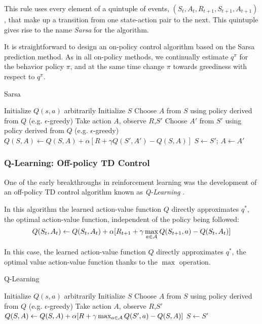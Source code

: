 This rule uses every element of a quintuple of events, $(S_t, A_t, R_{t+1}, S_{t+1}, A_{t+1})$, that make up a transition from one state-action pair to the next.
This quintuple gives rise to the name \textit{Sarsa} for the algorithm.

It is straightforward to design an on-policy control algorithm based on the Sarsa prediction method. As in all on-policy methods, we continually estimate $q^\pi$
for the behavior policy $\pi$, and at the same time change $\pi$ towards greediness with respect to $q^\pi$.

\begin{algorithm}[H]
    \caption{Sarsa}
    \label{alg:sarsa}
    \begin{algorithmic}[1]
        \STATE Initialize $Q(s,a)$ arbitrarily
        \LOOP
            \STATE Initialize $S$
            \STATE Choose $A$ from $S$ using policy derived from $Q$ (e.g. $\epsilon$-greedy)
            \REPEAT
                \STATE Take action $A$, observe $R$,$S'$
                \STATE Choose $A'$ from $S'$ using policy derived from $Q$ (e.g. $\epsilon$-greedy)
                \STATE $Q(S,A) \gets Q(S,A) + \alpha[R + \gamma Q(S',A') - Q(S, A)]$
                \STATE $S \gets S'$; $A \gets A'$
        \ENDLOOP
    \end{algorithmic}
\end{algorithm}

\subsubsection{Q-Learning: Off-policy TD Control}
One of the early breakthroughs in reinforcement learning was the development of an off-policy TD control algorithm known as \textit{Q-Learning}
\cite{Watkins:1989}.

In this algorithm the learned action-value function $Q$ directly approximates $q^*$, the optimal action-value function, independent of the 
policy being followed:
\begin{equation*}
    Q(S_t,A_t) \gets Q(S_t,A_t) + \alpha [R_{t+1} + \gamma \max_{a \in \mathcal{A}}Q(S_{t+1}, a) - Q(S_t, A_t)]
\end{equation*}

In this case, the learned action-value function $Q$ directly approximates  $q^*$, the optimal value action-value function thanks to the $\max$ operation.

\begin{algorithm}[H]
    \caption{Q-Learning}
    \label{alg:q-learning}
    \begin{algorithmic}[1]
        \STATE Initialize $Q(s,a)$ arbitrarily
        \LOOP
            \STATE Initialize $S$
            \STATE Choose $A$ from $S$ using policy derived from $Q$ (e.g. $\epsilon$-greedy)
            \REPEAT
                \STATE Take action $A$, observe $R$,$S'$
                \STATE $Q(S,A) \gets Q(S,A) + \alpha[R + \gamma \max_{a \in \mathcal{A}}Q(S',a) - Q(S, A)]$
                \STATE $S \gets S'$
        \ENDLOOP
    \end{algorithmic}
\end{algorithm}

